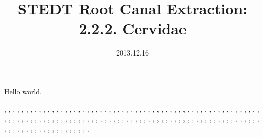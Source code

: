 \documentclass[11pt,twoside,twocolumn]{book}
\title{STEDT Root Canal Extraction:\\2.2.2. Cervidae}
\author{}
\date{2013.12.16}
\begin{document}
Hello world.

\citep{AAAM-SSM}, 
\citep{ABR1985}, 
\citep{ACH1975}, 
\citep{ACK-DTE}, 
\citep{ACK-GTL}, 
\citep{ACST}, 
\citep{AH-CSDPN}, 
\citep{AH-TND}, 
\citep{AJ-BED}, 
\citep{AM-NaLaze1}, 
\citep{Anony1959}, 
\citep{AO-diss}, 
\citep{AP-Pwo}, 
\citep{ARC-GMA}, 
\citep{ARO1980}, 
\citep{AS-ABCOC}, 
\citep{AT-MPB}, 
\citep{AT-Padam}, 
\citep{AW-CLGD}, 
\citep{AW-TBT}, 
\citep{B-ShrpaHQ}, 
\citep{BAI1909}, 
\citep{BAI1911}, 
\citep{BB-Belhare}, 
\citep{BBL-TL}, 
\citep{BDHH1971}, 
\citep{BER1965}, 
\citep{Bhat-Boro}, 
\citep{Bhat-TNL}, 
\citep{Bhat-TNV}, 
\citep{BK-AD}, 
\citep{BLBC-Khonom}, 
\citep{BM-Bah}, 
\citep{BM-Bbp}, 
\citep{BM-Hay}, 
\citep{BM-Hbp}, 
\citep{BM-Htvm}, 
\citep{BM-LH}, 
\citep{BM-Lim}, 
\citep{BM-PK7}, 
\citep{BM-PTNL}, 
\citep{BMMM-Bbp}, 
\citep{BON1930-31}, 
\citep{BOR-Sema}, 
\citep{BOR1938}, 
\citep{BP-PPWL}, 
\citep{BRO1837}, 
\citep{BRO1920}, 
\citep{BRO1951}, 
\citep{BRTMCM}, 
\citep{BS1971b}, 
\citep{BS1971c}, 
\citep{BSCH1971a}, 
\citep{BSCH1971c}, 
\citep{BSTL}, 
\citep{BUT1875}, 
\citep{CAU1969}, 
\citep{CB-SpitiQ}, 
\citep{CG-Diss}, 
\citep{CG-Dolak}, 
\citep{CG-Kath}, 
\citep{CG-NewariQ2}, 
\citep{CG-NewariQ3}, 
\citep{CHE1990}, 
\citep{CHU1867}, 
\citep{CK-CS}, 
\citep{CK-pGd}, 
\citep{CK-TujBQ}, 
\citep{CK-TujMQ}, 
\citep{CK-YiQ}, 
\citep{CLA1911}, 
\citep{COO}, 
\citep{CSL-YIzd}, 
\citep{CYS-Meithei}, 
\citep{DAP-Chm}, 
\citep{DAS-TED}, 
\citep{DB-Bisu}, 
\citep{DB-Lahu}, 
\citep{DB-Lisu}, 
\citep{DB-Ph}, 
\citep{DB-Phunoi}, 
\citep{DB-PLolo}, 
\citep{DB-Ugong}, 
\citep{DBS-PaO}, 
\citep{DC-Kucong}, 
\citep{Dell-Bai}, 
\citep{Deuri}, 
\citep{DHFRL}, 
\citep{DHR-IBWS}, 
\citep{DK-Moyon}, 
\citep{DLF-Gazhuo}, 
\citep{DM-BoroQan}, 
\citep{DM-BoroQno}, 
\citep{DM-GaroQan}, 
\citep{DM-GaroQno}, 
\citep{DM-KQan}, 
\citep{DM-KQno}, 
\citep{DM-TKQan}, 
\citep{DM-TKQno}, 
\citep{DNW-Gloss}, 
\citep{DNW-KhamQ}, 
\citep{DQ-AL}, 
\citep{DQ-Amdo}, 
\citep{DQ-Bai}, 
\citep{DQ-Batang}, 
\citep{DQ-Bola}, 
\citep{DQ-Dafang}, 
\citep{DQ-Daofu}, 
\citep{DQ-Gazhuo}, 
\citep{DQ-Hani}, 
\citep{DQ-Haoni}, 
\citep{DQ-Jiarong}, 
\citep{DQ-JinA}, 
\citep{DQ-JinB}, 
\citep{DQ-Jingpho}, 
\citep{DQ-KarenA}, 
\citep{DQ-KarenB}, 
\citep{DQ-Langsu}, 
\citep{DQ-Lashi}, 
\citep{DQ-Lolopho}, 
\citep{DQ-Naxi}, 
\citep{DQ-Nusu}, 
\citep{DQ-NusuA}, 
\citep{DQ-NusuB}, 
\citep{DQ-Nyiq}, 
\citep{DQ-QiangN}, 
\citep{DQ-Tujia}, 
\citep{DQ-Xiandao}, 
\citep{DQ-Xixia}, 
\citep{DQ-Yi-Axi}, 
\citep{DQ-Zaiwa}, 
\citep{DRM-Tk}, 
\citep{DS-Kan}, 
\citep{DS-Kayah}, 
\citep{DS-Patt}, 
\citep{DUN1908}, 
\citep{DVB-ECD}, 
\citep{DVB-LED}, 
\end{document}
